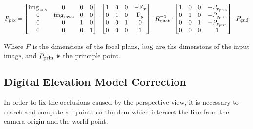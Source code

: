 \begin{equation}
P_{\textup{pix}} = 
\begin{bmatrix} 
\textup{img}_\textup{cols} & 0 & 0 & 0 \\
0 & \textup{img}_\textup{rows} & 0 & 0 \\
0 & 0 & 1 & 0 \\
0 & 0 & 0 & 1 
\end{bmatrix}
\cdot
\begin{bmatrix}
1 & 0 & 0 & -\textup{F}_x\\ 
0 & 1 & 0 & \textup{F}_y\\ 
0 & 0 & 1 & 0\\ 
0 & 0 & 0 & 1
\end{bmatrix}
\cdot
R^{-1}_{\textup{quat}} \cdot \begin{bmatrix}
1 & 0 & 0 & -P_{x_\textup{prin}} \\ 
0 & 1 & 0 & -P_{y_\textup{prin}}\\ 
0 & 0 & 1 & -P_{z_\textup{prin}}\\ 
0 & 0 & 0 & 1
\end{bmatrix} \cdot P_{\textup{gnd}} 
\end{equation}

Where $F$ is the dimensions of the focal plane, $\textup{img}$ are the dimensions of the input image, and $P_\textup{prin}$ is the principle point.


\subsection*{Digital Elevation Model Correction}

In order to fix the occlusions caused by the perspective view, it is necessary to search and 
compute all points on the dem which intersect the line from the camera origin and the world
point.



